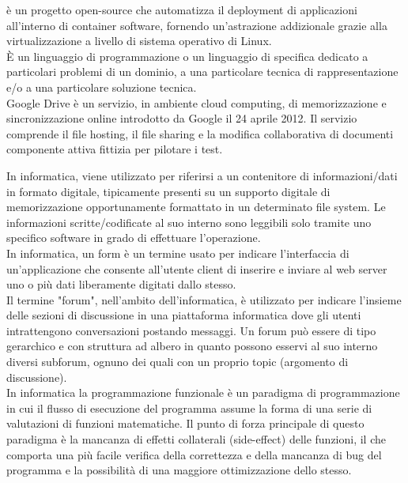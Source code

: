 \documentclass{scalatekids-article}
\begin{document}
 è un progetto open-source che automatizza il deployment di applicazioni all'interno di container software, fornendo un'astrazione addizionale grazie alla virtualizzazione a livello di sistema operativo di Linux.
\\

 È un linguaggio di programmazione o un linguaggio di specifica dedicato a particolari problemi di un dominio, a una particolare tecnica di rappresentazione e/o a una particolare soluzione tecnica.
\\

 Google Drive è un servizio, in ambiente cloud computing, di memorizzazione e sincronizzazione online introdotto da Google il 24 aprile 2012. Il servizio comprende il file hosting, il file sharing e la modifica collaborativa di documenti
\\

 componente attiva fittizia per pilotare i test.
\\



 In informatica, viene utilizzato per riferirsi a un contenitore di informazioni/dati in formato digitale, tipicamente presenti su un supporto digitale di memorizzazione opportunamente formattato in un determinato file system.
Le informazioni scritte/codificate al suo interno sono leggibili solo tramite uno specifico software in grado di effettuare l'operazione.
\\

 In informatica, un form è un termine usato per indicare l'interfaccia di un'applicazione che consente all'utente client di inserire e inviare al web server uno o più dati liberamente digitati dallo stesso.
\\

 Il termine "forum", nell'ambito dell'informatica, è utilizzato per indicare l'insieme delle sezioni di discussione in una piattaforma informatica dove gli utenti intrattengono conversazioni postando messaggi.
Un forum può essere di tipo gerarchico e con struttura ad albero in quanto possono esservi al suo interno diversi subforum, ognuno dei quali con un proprio topic (argomento di discussione).
\\

 In informatica la programmazione funzionale è un paradigma di programmazione in cui il flusso di esecuzione del programma assume la forma di una serie di valutazioni di funzioni matematiche. Il punto di forza principale di questo paradigma è la mancanza di effetti collaterali (side-effect) delle funzioni, il che comporta una più facile verifica della correttezza e della mancanza di bug del programma e la possibilità di una maggiore ottimizzazione dello stesso.
\\
\end{document}
